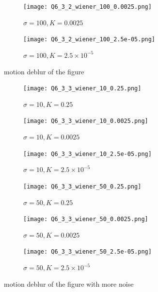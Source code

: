 \documentclass[
	12pt, %
]{style/fphw}
\begin{document}
\begin{figure}[H]
			\hfill
			\begin{subfigure}[b]{.3\textwidth}
				\centering
				\texttt{[image: Q6\_3\_2\_wiener\_100\_0.0025.png]}
				\caption{$\sigma=100, K=0.0025$}
				\label{Q6_3_2_wiener_100_0.0025}
			\end{subfigure}
			\hfill
			\begin{subfigure}[b]{.3\textwidth}
				\centering
				\texttt{[image: Q6\_3\_2\_wiener\_100\_2.5e-05.png]}
				\caption{$\sigma=100, K=2.5 \times 10^{-5}$}
				\label{Q6_3_2_wiener_100_2.5e-05}
			\end{subfigure}
		\caption{motion deblur of the figure}
		\label{motion deblur of the figure}	
	\end{figure}

\begin{figure}[H]
	\centering
		\begin{subfigure}[b]{.3\textwidth}
			\centering
			\texttt{[image: Q6\_3\_3\_wiener\_10\_0.25.png]}
			\caption{$\sigma=10, K=0.25$}
			\label{Q6_3_3_wiener_10_0.25}
		\end{subfigure}
		\hfill
		\begin{subfigure}[b]{.3\textwidth}
			\centering
			\texttt{[image: Q6\_3\_3\_wiener\_10\_0.0025.png]}
			\caption{$\sigma=10, K=0.0025$}
			\label{Q6_3_3_wiener_10_0.0025}
		\end{subfigure}
		\hfill
		\begin{subfigure}[b]{.3\textwidth}
			\centering
			\texttt{[image: Q6\_3\_3\_wiener\_10\_2.5e-05.png]}
			\caption{$\sigma=10, K=2.5 \times 10^{-5}$}
			\label{Q6_3_3_wiener_10_2.5e-05}
		\end{subfigure}
	\vfill
		\begin{subfigure}[b]{.3\textwidth}
			\centering
			\texttt{[image: Q6\_3\_3\_wiener\_50\_0.25.png]}
			\caption{$\sigma=50, K=0.25$}
			\label{Q6_3_3_wiener_50_0.25}
		\end{subfigure}
		\hfill
		\begin{subfigure}[b]{.3\textwidth}
			\centering
			\texttt{[image: Q6\_3\_3\_wiener\_50\_0.0025.png]}
			\caption{$\sigma=50, K=0.0025$}
			\label{Q6_3_3_wiener_50_0.0025}
		\end{subfigure}
		\hfill
		\begin{subfigure}[b]{.3\textwidth}
			\centering
			\texttt{[image: Q6\_3\_3\_wiener\_50\_2.5e-05.png]}
			\caption{$\sigma=50, K=2.5 \times 10^{-5}$}
			\label{Q6_3_3_wiener_50_2.5e-05}
		\end{subfigure}
	
	\caption{motion deblur of the figure with more noise}
	\label{motion deblur of the figure with more noise}	
\end{figure}
\end{document}
